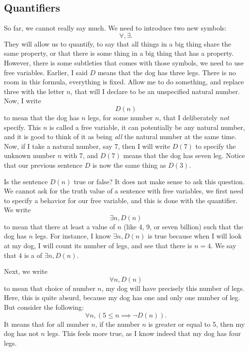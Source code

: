 \subsection{Quantifiers}

So far, we cannot really say much. We need to introduce two new symbols:
\begin{equation*}
    \forall, \exists.
\end{equation*}
They will allow us to quantify, to say that all things in a big thing share the same property, or that there is some thing in a big thing that has a property. However, there is some subtleties that comes with those symbols, we need to use free variables. Earlier, I said \( D \) means that the dog has three legs. There is no room in this formula, everything is fixed. Allow me to do something, and replace three with the letter \( n \), that will I declare to be an unspecified natural number. Now, I write 
\begin{equation*}
    D(n)
\end{equation*}  
to mean that the dog has \( n \) legs, for some number \( n \), that I deliberately \textit{not} specify. This \( n \) is called a free variable, it can potentially be any natural number, and it is good to think of it as being \textit{all} the natural number at the same time. Now, if I take a natural number, say \( 7 \), then I will write \( D(7) \) to specify the unknown number \( n \) with 7, and \( D(7) \) means that the dog has seven leg. Notice that our previous sentence \( D \) is now the same thing as \( D(3) \). 

Is the sentence \( D(n) \) true or false? It does not make sense to ask this question. We cannot ask for the truth value of a sentence with free variables, we first need to specify a behavior for our free variable, and this is done with the quantifier. We write
\begin{equation*}
    \exists n, D(n)
\end{equation*}
to mean that there  at least a value of \( n \) (like 4, 9, or seven billion) such that the dog has \( n \) legs. For instance, I know \( \exists n, D(n) \) is true because when I will look at my dog, I will count its number of legs, and see that there is \( n = 4 \). We say that \( 4 \) is a  of \( \exists n, D(n) \). 

Next, we write
\begin{equation*}
    \forall n, D(n)
\end{equation*}
to mean that  choice of number \( n \), my dog will have precisely this number of legs. Here, this is quite absurd, because my dog has one and only one number of leg. But consider the following:
\begin{equation*}
    \forall n, (5 \leq n \implies \neg D(n)).
\end{equation*} 
It means that for all number \( n \), if the number \( n \) is greater or equal to 5, then my dog has not \( n \) legs. This feels more true, as I know indeed that my dog has four legs. 

